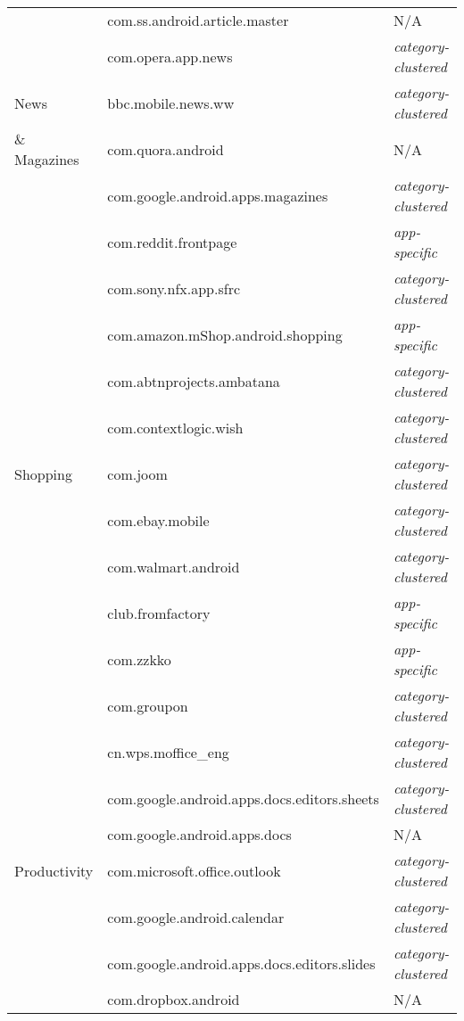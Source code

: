 \begin{table}
\begin{tabular}{|l|l|l|}
         & com.ss.android.article.master& N/A \\ \cline{2-3}
         & com.opera.app.news& \textit{category-clustered}\\ \cline{2-3}
        News  & bbc.mobile.news.ww& \textit{category-clustered}\\\cline{2-3}
       \& Magazines  & com.quora.android&  N/A \\ \cline{2-3}
         & com.google.android.apps.magazines& \textit{category-clustered} \\ \cline{2-3}
         & com.reddit.frontpage& \textit{app-specific}\\ \cline{2-3}
         & com.sony.nfx.app.sfrc & \textit{category-clustered} \\
         \hline 
        \multirow{7}{*}{Shopping} & com.amazon.mShop.android.shopping& \textit{app-specific}\\ \cline{2-3}
         & com.abtnprojects.ambatana&  \textit{category-clustered}\\ \cline{2-3}
         & com.contextlogic.wish& \textit{category-clustered}\\ \cline{2-3}
         & com.joom& \textit{category-clustered} \\ \cline{2-3}
          & com.ebay.mobile& \textit{category-clustered}\\ \cline{2-3}
         & com.walmart.android& \textit{category-clustered} \\ \cline{2-3}
         & club.fromfactory& \textit{app-specific}\\ \cline{2-3}
         & com.zzkko& \textit{app-specific}\\ \cline{2-3}
         & com.groupon&  \textit{category-clustered}\\
         \hline
         \multirow{7}{*}{Productivity} & cn.wps.moffice\_eng& \textit{category-clustered}\\ \cline{2-3}
         & com.google.android.apps.docs.editors.sheets& \textit{category-clustered}\\ \cline{2-3}
         & com.google.android.apps.docs& N/A \\ \cline{2-3}
         & com.microsoft.office.outlook& \textit{category-clustered}\\ \cline{2-3}
         & com.google.android.calendar &\textit{category-clustered} \\ \cline{2-3}
          & com.google.android.apps.docs.editors.slides& \textit{category-clustered}\\ \cline{2-3}
          & com.dropbox.android & N/A \\ \hline
    \end{tabular}
    \label{tab:apps2}
\end{table}


